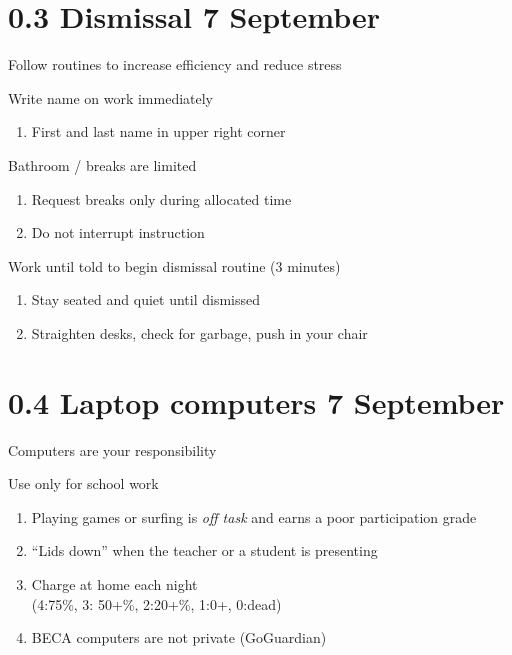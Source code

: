 \documentclass[onlytextwidth]{beamer}
\begin{document}
\section{0.3 Dismissal \hfill 7 September}
\begin{frame}{Follow routines to increase efficiency and reduce stress}
  \begin{block}{Write name on work immediately}
    \begin{enumerate}
      \item First and last name in upper right corner
    \end{enumerate}
    \end{block}
  \begin{block}{Bathroom / breaks are limited}
    \begin{enumerate}
      \item Request breaks only during allocated time
      \item Do not interrupt instruction
    \end{enumerate}
    \end{block}
  \begin{block}{Work until told to begin dismissal routine (3 minutes)}
    \begin{enumerate}
      \item Stay seated and quiet until dismissed
      \item Straighten desks, check for garbage, push in your chair
    \end{enumerate}
    \end{block}
  \end{frame}

\section{0.4 Laptop computers \hfill 7 September}
\begin{frame}{Computers are your responsibility}
  \begin{block}{Use only for school work}
    \begin{enumerate}
      \item Playing games or surfing is \emph{off task} and earns a poor participation grade
      \item ``Lids down'' when the teacher or a student is presenting
      \item Charge at home each night\\
        (4:75\%, 3: 50+\%, 2:20+\%, 1:0+, 0:dead)
      \item BECA computers are not private (GoGuardian)
    \end{enumerate}
    \end{block}
  \end{frame}
\end{document}
